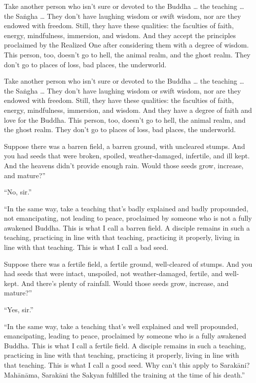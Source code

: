 \documentclass[12pt,openany]{book}%
\begin{document}
Take another person who isn’t sure or devoted to the Buddha … the teaching … the \textsanskrit{Saṅgha} … They don’t have laughing wisdom or swift wisdom, nor are they endowed with freedom. Still, they have these qualities: the faculties of faith, energy, mindfulness, immersion, and wisdom. And they accept the principles proclaimed by the Realized One after considering them with a degree of wisdom. This person, too, doesn’t go to hell, the animal realm, and the ghost realm. They don’t go to places of loss, bad places, the underworld. 

Take another person who isn’t sure or devoted to the Buddha … the teaching … the \textsanskrit{Saṅgha} … They don’t have laughing wisdom or swift wisdom, nor are they endowed with freedom. Still, they have these qualities: the faculties of faith, energy, mindfulness, immersion, and wisdom. And they have a degree of faith and love for the Buddha. This person, too, doesn’t go to hell, the animal realm, and the ghost realm. They don’t go to places of loss, bad places, the underworld. 

Suppose there was a barren field, a barren ground, with uncleared stumps. And you had seeds that were broken, spoiled, weather-damaged, infertile, and ill kept. And the heavens didn’t provide enough rain. Would those seeds grow, increase, and mature?” 

“No, sir.” 

“In the same way, take a teaching that’s badly explained and badly propounded, not emancipating, not leading to peace, proclaimed by someone who is not a fully awakened Buddha. This is what I call a barren field. A disciple remains in such a teaching, practicing in line with that teaching, practicing it properly, living in line with that teaching. This is what I call a bad seed. 

Suppose there was a fertile field, a fertile ground, well-cleared of stumps. And you had seeds that were intact, unspoiled, not weather-damaged, fertile, and well-kept. And there’s plenty of rainfall. Would those seeds grow, increase, and mature?” 

“Yes, sir.” 

“In the same way, take a teaching that’s well explained and well propounded, emancipating, leading to peace, proclaimed by someone who is a fully awakened Buddha. This is what I call a fertile field. A disciple remains in such a teaching, practicing in line with that teaching, practicing it properly, living in line with that teaching. This is what I call a good seed. Why can’t this apply to \textsanskrit{Sarakāni}? \textsanskrit{Mahānāma}, \textsanskrit{Sarakāni} the Sakyan fulfilled the training at the time of his death.” 
\end{document}

